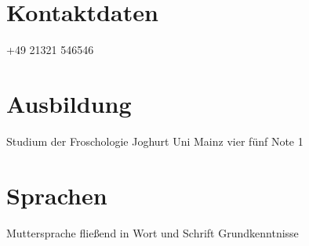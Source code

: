 \documentclass[11pt, a4paper] {moderncv}
\begin{document}
\maketitle

\section{Kontaktdaten}
\cvline{\mobilesymbol} {+49 21321 546546}

\section{Ausbildung}
 {Studium der Froschologie} {Joghurt Uni Mainz} {vier} {f\"unf} {Note 1}

\section{Sprachen}
 {Muttersprache}
 {flie\ss end in Wort und Schrift}
 {Grundkenntnisse}
\end{document}
